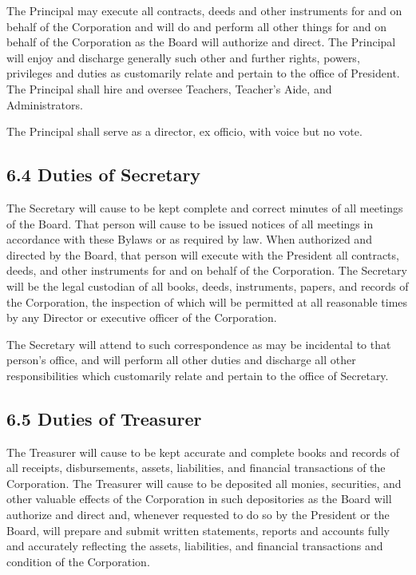\documentclass[
]{book}
\begin{document}
The Principal may execute all contracts, deeds and other instruments for and on behalf of the Corporation and will do and perform all other things for and on behalf of the Corporation as the Board will authorize and direct. The Principal will enjoy and discharge generally such other and further rights, powers, privileges and duties as customarily relate and pertain to the office of President. The Principal shall hire and oversee Teachers, Teacher's Aide, and Administrators.

The Principal shall serve as a director, ex officio, with voice but no vote.

\subsection*{6.4 Duties of Secretary}\label{duties-of-secretary}

The Secretary will cause to be kept complete and correct minutes of all meetings of the Board. That person will cause to be issued notices of all meetings in accordance with these Bylaws or as required by law. When authorized and directed by the Board, that person will execute with the President all contracts, deeds, and other instruments for and on behalf of the Corporation. The Secretary will be the legal custodian of all books, deeds, instruments, papers, and records of the Corporation, the inspection of which will be permitted at all reasonable times by any Director or executive officer of the Corporation.

The Secretary will attend to such correspondence as may be incidental to that person's office, and will perform all other duties and discharge all other responsibilities which customarily relate and pertain to the office of Secretary.

\subsection*{6.5 Duties of Treasurer}\label{duties-of-treasurer}

The Treasurer will cause to be kept accurate and complete books and records of all receipts, disbursements, assets, liabilities, and financial transactions of the Corporation. The Treasurer will cause to be deposited all monies, securities, and other valuable effects of the Corporation in such depositories as the Board will authorize and direct and, whenever requested to do so by the President or the Board, will prepare and submit written statements, reports and accounts fully and accurately reflecting the assets, liabilities, and financial transactions and condition of the Corporation.
\end{document}
